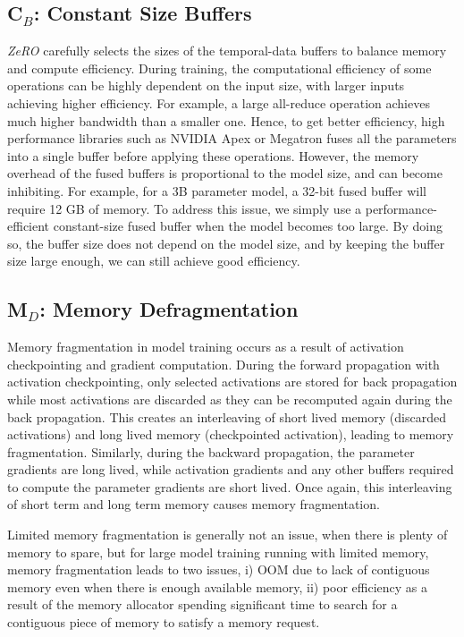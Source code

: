 \documentclass{article}
\newcommand{\name}{\emph{ZeRO}\xspace}
\begin{document}
\subsection{C$_B$: Constant Size Buffers}\label{sec:buffer}
\name carefully selects the sizes of the temporal-data buffers to balance memory and compute efficiency.
During training, the computational efficiency of some operations can be highly dependent on the input size, with larger inputs achieving higher efficiency. For example, a large all-reduce operation achieves much higher bandwidth than a smaller one. Hence, to get better efficiency, high performance libraries such as NVIDIA Apex or Megatron fuses all the parameters into a single buffer before applying these operations. However, the memory overhead of the fused buffers is proportional to the model size, and can become inhibiting. For example, for a 3B parameter model, a 32-bit fused buffer will require 12 GB of memory. To address this issue, we simply use a performance-efficient constant-size fused buffer when the model becomes too large. By doing so, the buffer size does not depend on the model size, and by keeping the buffer size large enough, we can still achieve good efficiency.

\subsection{M$_D$: Memory Defragmentation}
Memory fragmentation in model training occurs as a result of activation checkpointing and gradient computation. During the forward propagation with activation checkpointing, only selected activations are stored for back propagation while most activations are discarded as they can be recomputed again during the back propagation. This creates an interleaving of short lived memory (discarded activations) and long lived memory (checkpointed activation), leading to memory fragmentation. Similarly, during the backward propagation, the parameter gradients are long lived, while activation gradients and any other buffers required to compute the parameter gradients are short lived. Once again, this interleaving of short term and long term memory causes memory fragmentation.

Limited memory fragmentation is generally not an issue, when there is plenty of memory to spare, but for large model training running with limited memory, memory fragmentation leads to two issues, i) OOM due to lack of contiguous memory even when there is enough available memory, ii) poor efficiency as a result of the memory allocator spending significant time to search for a contiguous piece of memory to satisfy a memory request.
\end{document}
